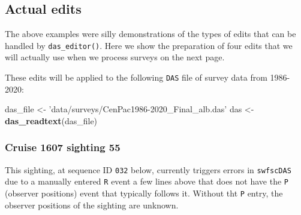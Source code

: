 \documentclass[
]{book}
\newenvironment{Shaded}{\begin{snugshade}}{\end{snugshade}}
\newcommand{\KeywordTok}[1]{\textcolor[rgb]{0.13,0.29,0.53}{\textbf{#1}}}
\newcommand{\NormalTok}[1]{#1}
\newcommand{\StringTok}[1]{\textcolor[rgb]{0.31,0.60,0.02}{#1}}
\begin{document}
\hypertarget{actual-edits}{%
\subsection*{Actual edits}\label{actual-edits}}

The above examples were silly demonstrations of the types of edits that can be handled by \texttt{das\_editor()}. Here we show the preparation of four edits that we will actually use when we process surveys on the next page.

These edits will be applied to the following \texttt{DAS} file of survey data from 1986-2020:

\begin{Shaded}
\begin{Highlighting}[]
\NormalTok{das_file <-}\StringTok{ 'data/surveys/CenPac1986-2020_Final_alb.das'}
\NormalTok{das <-}\StringTok{ }\KeywordTok{das_readtext}\NormalTok{(das_file)}
\end{Highlighting}
\end{Shaded}

\hypertarget{cruise-1607-sighting-55}{%
\subsubsection*{Cruise 1607 sighting 55}\label{cruise-1607-sighting-55}}

This sighting, at sequence ID \texttt{032} below, currently triggers errors in \texttt{swfscDAS} due to a manually entered \texttt{R} event a few lines above that does not have the \texttt{P} (observer positions) event that typically follows it. Without tht \texttt{P} entry, the observer positions of the sighting are unknown.
\end{document}
